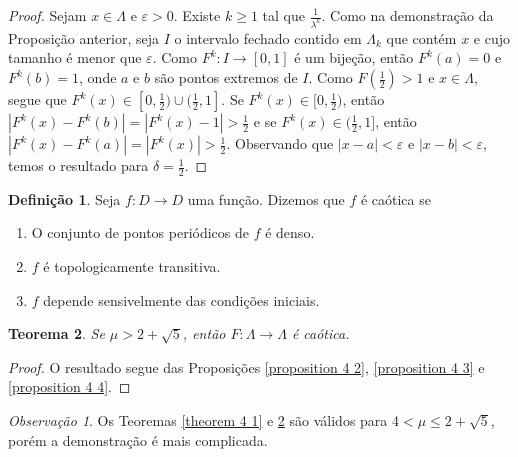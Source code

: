 \documentclass[a4paper, 12pt]{article}
\theoremstyle{definition}
\newtheorem{definition}{Definição}[section]
\theoremstyle{plain}
\theoremstyle{plain}
\theoremstyle{plain}
\newtheorem{theorem}[definition]{Teorema}
\theoremstyle{remark}
\newtheorem*{remark}{Observação}
\begin{document}
\begin{proof}
Sejam $x \in \Lambda$ e $\varepsilon > 0$. Existe $k \geq 1$ tal que $\frac{1}{\lambda^k}$. Como na demonstração da Proposição anterior, seja $I$ o intervalo fechado contido em $\Lambda_k$ que contém $x$ e cujo tamanho é menor que $\varepsilon$. Como $F^k: I \rightarrow [0, 1]$ é um bijeção, então $F^k(a) = 0$ e  $F^k(b) = 1$, onde $a$ e $b$ são pontos extremos de $I$. Como $F(\frac{1}{2}) > 1$ e $x \in \Lambda$, segue que $F^{k}(x) \in [0, \frac{1}{2}) \cup (\frac{1}{2}, 1]$. Se $F^{k}(x) \in [0, \frac{1}{2})$, então $|F^k(x) - F^k(b)| = |F^k(x) - 1| > \frac{1}{2}$ e se $F^{k}(x) \in (\frac{1}{2}, 1]$, então $|F^k(x) - F^k(a)| = |F^k(x)| > \frac{1}{2}$. Observando que $|x - a| < \varepsilon$ e  $|x - b| < \varepsilon$, temos o resultado para $\delta = \frac{1}{2}$. 
\end{proof}

\begin{definition}
Seja $f: D \rightarrow D$ uma função. Dizemos que $f$ é caótica se
\begin{enumerate}
\item O conjunto de pontos periódicos de $f$ é denso.
\item $f$ é topologicamente transitiva.
\item $f$ depende sensivelmente das condições iniciais.
\end{enumerate}
\end{definition}

\begin{theorem}
\label{theorem 4 2}
Se $\mu > 2 + \sqrt{5}$, então $F: \Lambda \rightarrow \Lambda$ é caótica.
\end{theorem}

\begin{proof}
O resultado segue das Proposições \ref{proposition 4 2}, \ref{proposition 4 3} e \ref{proposition 4 4}.
\end{proof}

\begin{remark}
Os Teoremas \ref{theorem 4 1} e \ref{theorem 4 2} são válidos para $4 < \mu \leq 2 + \sqrt{5}$, porém a demonstração é mais complicada.
\end{remark}
\end{document}
